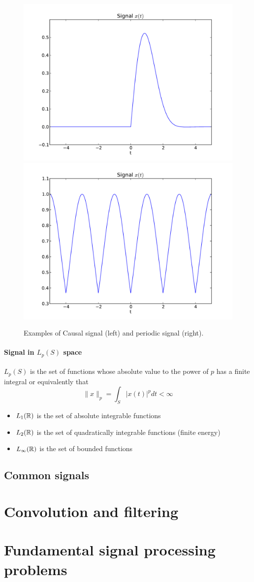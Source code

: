 \begin{figure}[t]
    \centering
    \includegraphics[width=.45\linewidth]{imgs/sig_conv/sig_causal.pdf}
    \includegraphics[width=.45\linewidth]{imgs/sig_conv/sig_per.pdf}
    \caption{Examples of Causal signal (left) and periodic signal (right).}
    \label{fig:ex_causal_per}
\end{figure}



\paragraph{Signal in $L_p(S)$ space}
$L_p(S)$ is the set of functions whose absolute value to the power of $p$
has a finite integral or equivalently that
\begin{equation}
  \|x\|_p=\int_S |x(t)|^p dt < \infty
  \label{eq:lp_space}
\end{equation}
\begin{itemize}
  \item $L_1(\mathbb{R})$ is the set of absolute integrable functions
  \item $L_2(\mathbb{R})$ is the set of quadratically integrable functions (finite energy)
  \item $L_\infty(\mathbb{R})$ is the set of bounded functions
\end{itemize}

\subsection{Common signals}
\label{sec:common_sig}

\section{Convolution and filtering}
\label{sec:conv_filtering}

\section{Fundamental signal processing problems}
\label{sec:sp_prob}